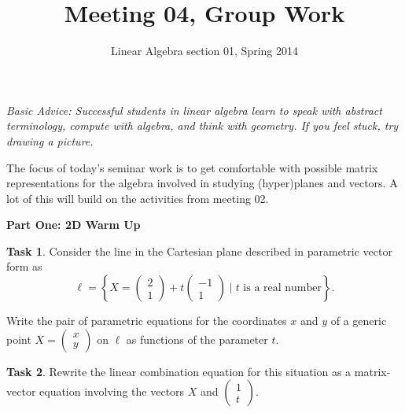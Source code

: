 \documentclass[11pt]{amsart}
\theoremstyle{definition}
\newtheorem{task}{Task}
\begin{document}
\title{Meeting 04, Group Work}
\author{Linear Algebra section 01, Spring 2014}

\maketitle

\emph{Basic Advice: Successful students in linear algebra learn to speak with abstract terminology, compute with algebra, and think with geometry. If you feel stuck, try drawing a picture.}

\vspace{1cm}

The focus of today's seminar work is to get comfortable with possible matrix representations for the algebra involved in studying (hyper)planes and vectors. A lot of this will build on the activities from meeting 02.

\vspace{.5cm}

\begin{center}\textbf{Part One: 2D Warm Up}\end{center}

\begin{task}
Consider the line in the Cartesian plane described in parametric vector form as
\[
\ell = \left\{ X = \left(\begin{smallmatrix} 2 \\ 1 \end{smallmatrix}\right)
+ t \left( \begin{smallmatrix} -1 \\ 1 \end{smallmatrix} \right) \mid \text{$t$ is a real number}\right\}.
\]

Write the pair of parametric equations for the coordinates $x$ and $y$ of a generic point $X = \left( \begin{smallmatrix} x \\ y \end{smallmatrix}\right)$ on $\ell$ as functions of the parameter $t$.
\end{task}

\vspace{.75in}

\begin{task}
Rewrite the linear combination equation for this situation as a matrix-vector equation involving the vectors $X$ and $\left(\begin{smallmatrix}1 \\ t \end{smallmatrix}\right)$.
\end{task}
\end{document}
